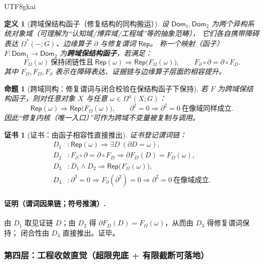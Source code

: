 \documentclass[12pt]{article}
\newtheorem{definition}{定义}[section]
\newtheorem{proposition}{命题}[section]
\newtheorem{Certificate}{证书}[section]
\begin{document}
\begin{CJK*}{UTF8}{gkai}
\begin{definition}[跨域保结构函子（修复结构的同构搬运）]
设 $\mathsf{Dom}_1,\mathsf{Dom}_2$ 为两个异构系统对象域（可理解为“认知域/博弈域/工程域”等的抽象范畴），
它们各自携带障碍表达 $\Omega^\ast(-;G)$、边缘算子 $\partial$ 与修复谓词 $\mathsf{Rep}$。
称一个映射（函子）$F:\mathsf{Dom}_1\to\mathsf{Dom}_2$ 为\textbf{跨域保结构函子}，若满足：
\[
  F_\Omega(\omega)\ \text{保持闭链性且}\ \mathsf{Rep}(\omega)\Rightarrow \mathsf{Rep}\bigl(F_\Omega(\omega)\bigr),
  \qquad
  F_\partial\circ \partial=\partial\circ F_D.
\]
其中 $F_\Omega,F_D,F_\partial$ 表示在障碍表达、证据链与边缘算子层面的相容提升。
\end{definition}

\begin{proposition}[跨域同构：修复谓词与闭合校验在保结构函子下保持]
\label{prop:tex29-ch15-level3}
若 $F$ 为跨域保结构函子，则对任意对象 $X$ 与任意 $\omega\in\Omega^n(X;G)$：
\[
  \mathsf{Rep}(\omega)\Rightarrow \mathsf{Rep}\bigl(F_\Omega(\omega)\bigr),
  \qquad
  \partial^2=0\Rightarrow \partial^2=0\ \text{在像域同样成立}.
\]
因此“修复内核（唯一入口）”可作为跨域不变量被复制与调用。
\end{proposition}

\begin{Certificate}[证书：由函子相容性直接推出]
\label{cert:tex29-ch15-level3}
证书登记谓词链：
\[
\begin{aligned}
  D_1 &: \mathsf{Rep}(\omega)\Rightarrow \exists D\ (\partial D=\omega),\\
  D_2 &: F_\partial\circ \partial=\partial\circ F_D\Rightarrow \partial F_D(D)=F_\Omega(\omega),\\
  D_3 &: D_1\wedge D_2\Rightarrow \mathsf{Rep}\bigl(F_\Omega(\omega)\bigr),\\
  D_4 &: \partial^2=0\Rightarrow F_\partial(\partial^2)=0\Rightarrow \partial^2=0\ \text{在像域成立}.
\end{aligned}
\]
\end{Certificate}

\paragraph{证明（谓词因果链；符号推演）.}
由 $D_1$ 取见证链 $D$；由 $D_2$ 得 $\partial F_D(D)=F_\Omega(\omega)$，从而由 $D_3$ 得修复谓词保持；
闭合性由 $D_4$ 直接推出。证毕。

\subsubsection{第四层：工程收敛直觉（超限兜底 + 有限截断可落地）}
\label{subsubsec:tex29-ch15-level4}


\end{CJK*}
\end{document}
